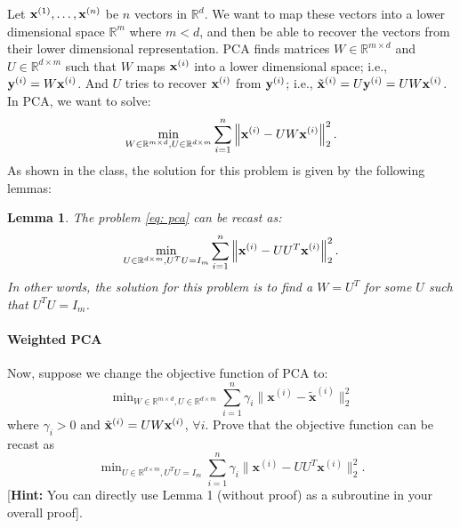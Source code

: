 \documentclass[11pt]{article}
\begin{document}
\solntrue

 
\newif\ifaditya
\adityatrue

\vspace{-0.5in}
\newtheorem{lemma}{Lemma}[section]

 Let ${\mathbf x}^{(1)},\ldots, {\mathbf x}^{(n)}$ be $n$ vectors in $\mathbb{R}^d$. We want to map these vectors into a lower dimensional space $\mathbb{R}^m$ where $m < d$, and then be able to recover the vectors from their lower dimensional representation. PCA finds matrices $W\in\mathbb{R}^{m\times d}$ and $U\in\mathbb{R}^{d\times m}$ such that $W$ maps ${\mathbf x}^{(i)}$ into a lower dimensional space; i.e., ${\mathbf y}^{(i)} = W{\mathbf x}^{(i)}$. And $U$ tries to recover ${\mathbf x}^{(i)}$ from ${\mathbf y}^{(i)}$; i.e., $\tilde{{\mathbf x}}^{(i)} = U{\mathbf y}^{(i)} = UW{\mathbf x}^{(i)}$. In PCA, we want to solve: 
 \begin{equation}
 \label{eq: pca}
     \min_{W\in\mathbb{R}^{m\times d}, U\in\mathbb{R}^{d\times m}} \sum_{i=1}^{n} \left\lVert  {\mathbf x}^{(i)} - UW{\mathbf x}^{(i)}\right\rVert_2^2.
 \end{equation}
As shown in the class, the solution for this problem is given by the following lemmas:
\begin{lemma}
The problem \eqref{eq: pca} can be recast as: 
\begin{equation}
    \min_{ U\in\mathbb{R}^{d\times m}, U^TU = I_m} \sum_{i=1}^{n} \left\lVert  {\mathbf x}^{(i)} - UU^T{\mathbf x}^{(i)}\right\rVert_2^2.
\end{equation}
In other words, the solution for this problem is to find a $W = U^T$ for some $U$ such that $U^TU = I_m$.
\end{lemma}
 
\paragraph{Weighted PCA} Now, suppose we change the objective function of PCA to:
\[
\mathop{\text{min}}_{W\in\mathbb{R}^{m\times d}, U\in\mathbb{R}^{d\times m}}\sum^n_{i=1}\gamma_i\|\mathbf{x}^{(i)}-\widetilde{\mathbf{x}}^{(i)}\|^2_2
\]
where $\gamma_i>0$ and $\tilde{{\mathbf x}}^{(i)} = UW{\mathbf x}^{(i)}$, $\forall i$. 
Prove that the objective function can be recast as
  \[
     \mathop{\text{min}}_{U\in\mathbb{R}^{d\times m}, U^TU = I_{m}}\sum^n_{i=1}\gamma_i \|\mathbf{x}^{(i)}-UU^T{\mathbf{x}^{(i)}}\|^2_2.
\]
[\textbf{Hint:} You can directly use Lemma 1 (without proof) as a subroutine in your overall proof].
\end{document}

